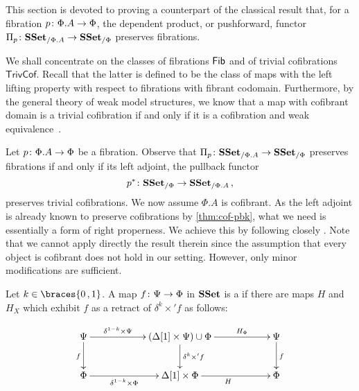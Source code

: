 \documentclass[reqno,10pt,a4paper,oneside,draft]{amsart}
\begin{document}
This section is devoted to proving a counterpart of the classical result that, for a fibration $p \colon \Phi.A \rightarrow \Phi$, the dependent product, or pushforward, functor $\Pi_p \colon \mathbf{SSet}_{/\Phi.A} \to \mathbf{SSet}_{/\Phi}$ preserves fibrations. 

\medskip

We shall concentrate on the classes of fibrations $\mathsf{Fib}$ and of trivial cofibrations $\mathsf{TrivCof}$. 
Recall that the latter is defined to be the class of maps with the left lifting property
with respect to fibrations with fibrant codomain. Furthermore, by the general theory of weak model
structures, we know that a map with cofibrant domain is a trivial cofibration if and only if it is a cofibration
and weak equivalence~\cite[Proposition~2.2.9]{henry2018wms}.  

\medskip

Let $p \colon \Phi.A \rightarrow \Phi$ be a fibration. Observe that $\Pi_p \colon \mathbf{SSet}_{/\Phi.A} \to \mathbf{SSet}_{/\Phi}$  preserves fibrations if and only if its left adjoint, the pullback functor
\[
p^* \colon \mathbf{SSet}_{/\Phi} \to \mathbf{SSet}_{/\Phi.A} \, , 
\]
preserves trivial cofibrations. We now assume  $\Phi.A$ is cofibrant. 
As the left adjoint is already known to preserve cofibrations by \cref{thm:cof-pbk}, what we need is essentially a form of right properness. We achieve this by following closely \cite[Section~3]{gambino2017frobenius}. Note that we cannot apply directly the result therein since 
the assumption that every object is cofibrant does not hold in our setting. However, only minor modifications are sufficient.




\begin{definition} \label{def:strhtpyequiv} Let $k \in \braces{0 \, , 1 }$.
A map $f \colon \Psi \rightarrow \Phi$ in $\mathbf{SSet}$ is a  if there are maps $H$ and $H_X$ which exhibit $f$ as a retract of $\delta^k \times ' f$ as follows:

\[
\xymatrix@C=2cm{
\Psi \ar[d]_{f} \ar[r]^-{\delta^{1-k} \times \Psi} & 
( \Delta[1] \times \Psi ) \cup \Phi \ar[d]^{\delta^k \times' f} \ar[r]^-{H_\Phi} & 
\Psi \ar[d]^{f} \\
\Phi \ar[r]_-{\delta^{1-k} \times \Phi}  & 
\Delta[1] \times \Phi \ar[r]_{H} &
\Phi  }
\]
\end{definition}
\end{document}
